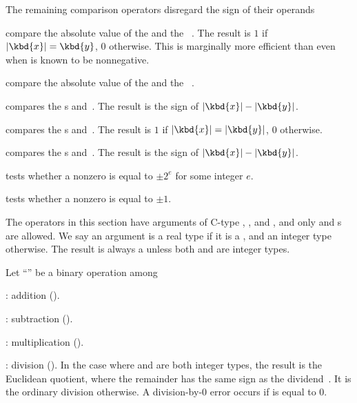 
The remaining comparison operators disregard the sign of their operands

 compare the absolute value of the
  and the ~. The result is $1$ if
$|\kbd{x}| = \kbd{y}$, $0$ otherwise. This is marginally more efficient
than  even when  is known to be nonnegative.


 compare the absolute value of the
  and the ~.



 compares the s  and~.
The result is the sign of $|\kbd{x}| - |\kbd{y}|$.

 compares the s 
and~. The result is $1$ if $|\kbd{x}| = |\kbd{y}|$, $0$ otherwise.

 compares the s  and~.
The result is the sign of $|\kbd{x}| - |\kbd{y}|$.

 tests whether a nonzero  
is equal to $\pm 2^e$ for some integer $e$.

 tests whether a nonzero  
is equal to $\pm 1$.

\label{se:genbinop} The operators in this
section have arguments of C-type , , and , and
only  and  s are allowed. We say an argument is a
real type if it is a  , and an integer type otherwise. The
result is always a  unless both  and  are integer
types.

Let ``\op'' be a binary operation among

\item {}: addition ().

\item {}: subtraction ().

\item {}: multiplication ().

\item {}: division (). In the case where  and 
are both integer types, the result is the Euclidean quotient, where the
remainder has the same sign as the dividend~. It is the ordinary
division otherwise. A division-by-$0$ error occurs if  is equal to
$0$.

